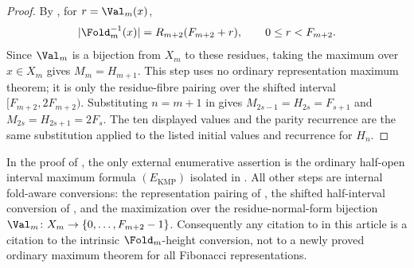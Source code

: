 \begin{proof}
By , for \(r=\Val_m(x)\),
\[
  |\Fold_m^{-1}(x)|=R_{m+2}(F_{m+2}+r),
  \qquad 0\le r<F_{m+2}.
\]
Since \(\Val_m\) is a bijection from \(X_m\) to these residues, taking the maximum
over \(x\in X_m\) gives \(M_m=H_{m+1}\).  This step uses no ordinary representation
maximum theorem; it is only the residue-fibre pairing over the shifted interval
\([F_{m+2},2F_{m+2})\).  Substituting \(n=m+1\) in
 gives
\(M_{2s-1}=H_{2s}=F_{s+1}\) and \(M_{2s}=H_{2s+1}=2F_s\).  The ten displayed
values and the parity recurrence are the same substitution applied to the listed
initial values and recurrence for \(H_n\).
\end{proof}

\begin{proposition}
\label{prop:ordinary-maximum-import-isolation}
\label{thm:ordinary-maximum-citation-boundary-for-height}
In the proof of , the only external
enumerative assertion is the ordinary half-open interval maximum formula
\((E_{\mathrm{KMP}})\) isolated in
.
All other steps are internal fold-aware conversions: the representation pairing
of , the shifted half-interval
conversion of , and the
maximization over the residue-normal-form bijection \(\Val_m\colon X_m\to
\{0,
\ldots,F_{m+2}-1\}\).  Consequently any citation to
 in this article is a citation to the
intrinsic \(\Fold_m\)-height conversion, not to a newly proved ordinary maximum
theorem for all Fibonacci representations.
\end{proposition}

